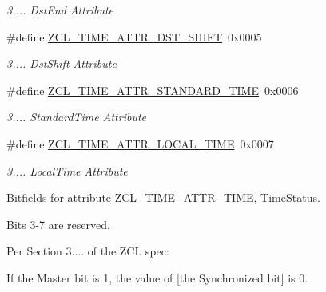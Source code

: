 \begin{DoxyCompactItemize}
\begin{DoxyCompactList}\small\item\em 3.... Dst\-End Attribute \end{DoxyCompactList}\item 
\hypertarget{group__zcl__time_ga62da9f7b4065ce9e96b0f818a4b9bb5c}{\#define \hyperlink{group__zcl__time_ga62da9f7b4065ce9e96b0f818a4b9bb5c}{Z\-C\-L\-\_\-\-T\-I\-M\-E\-\_\-\-A\-T\-T\-R\-\_\-\-D\-S\-T\-\_\-\-S\-H\-I\-F\-T}~0x0005}\label{group__zcl__time_ga62da9f7b4065ce9e96b0f818a4b9bb5c}

\begin{DoxyCompactList}\small\item\em 3.... Dst\-Shift Attribute \end{DoxyCompactList}\item 
\hypertarget{group__zcl__time_gac2ab06404c97ad9c24f6e53297966d06}{\#define \hyperlink{group__zcl__time_gac2ab06404c97ad9c24f6e53297966d06}{Z\-C\-L\-\_\-\-T\-I\-M\-E\-\_\-\-A\-T\-T\-R\-\_\-\-S\-T\-A\-N\-D\-A\-R\-D\-\_\-\-T\-I\-M\-E}~0x0006}\label{group__zcl__time_gac2ab06404c97ad9c24f6e53297966d06}

\begin{DoxyCompactList}\small\item\em 3.... Standard\-Time Attribute \end{DoxyCompactList}\item 
\hypertarget{group__zcl__time_gad734cb8827c2307184fd74f1f1336c4f}{\#define \hyperlink{group__zcl__time_gad734cb8827c2307184fd74f1f1336c4f}{Z\-C\-L\-\_\-\-T\-I\-M\-E\-\_\-\-A\-T\-T\-R\-\_\-\-L\-O\-C\-A\-L\-\_\-\-T\-I\-M\-E}~0x0007}\label{group__zcl__time_gad734cb8827c2307184fd74f1f1336c4f}

\begin{DoxyCompactList}\small\item\em 3.... Local\-Time Attribute \end{DoxyCompactList}\end{DoxyCompactItemize}
\label{_amgrp01747264fe7bf50731df0522c351974e}%
Bitfields for attribute \hyperlink{group__zcl__time_ga6abf0e2cc70ac533ebe153a40185be63}{Z\-C\-L\-\_\-\-T\-I\-M\-E\-\_\-\-A\-T\-T\-R\-\_\-\-T\-I\-M\-E}, Time\-Status.

Bits 3-\/7 are reserved.

Per Section 3.... of the Z\-C\-L spec\-:
\begin{DoxyItemize}
\item If the Master bit is 1, the value of \mbox{[}the Synchronized bit\mbox{]} is 0.
\end{DoxyItemize}


